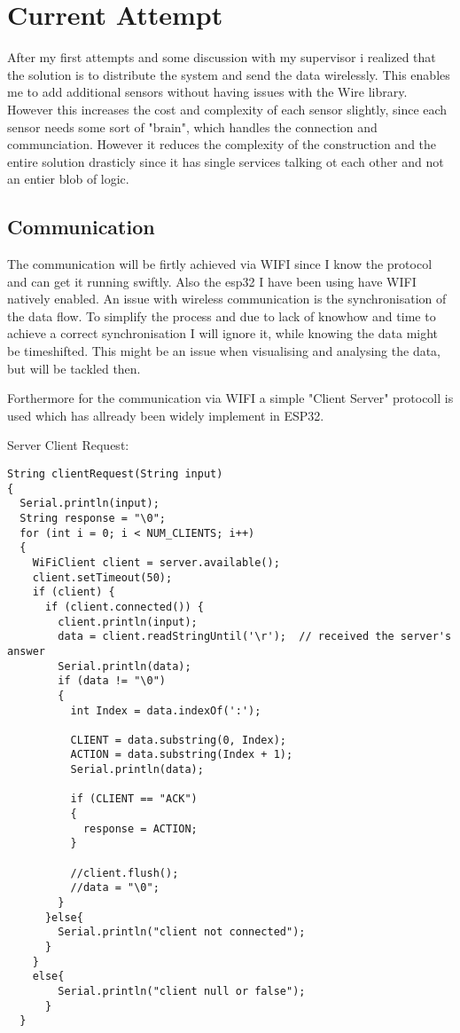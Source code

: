 \chapter*{Current Attempt}
\label{chap:Technical CHallenges}
\renewcommand{\thesection}{\arabic{section}}
\setcounter{section}{0}

After my first attempts and some discussion with my supervisor i realized that the solution is to distribute the system and send the data wirelessly. This enables me to add additional sensors without having issues with the Wire library. However this increases the cost and complexity of each sensor slightly, since each sensor needs some sort of "brain", which handles the connection and communciation. 
However it reduces the complexity of the construction and the entire solution drasticly since it has single services talking ot each other and not an entier blob of logic. 

\section{Communication}

The communication will be firtly achieved via WIFI since I know the protocol and can get it running swiftly. Also the esp32 I have been using have WIFI natively enabled. 
An issue with wireless communication is the synchronisation of the data flow. To simplify the process and due to lack of knowhow and time to achieve a correct synchronisation I will ignore it, while knowing the data might be timeshifted. 
This might be an issue when visualising and analysing the data, but will be tackled then.

Forthermore for the communication via WIFI a simple "Client Server" protocoll is used which has allready been widely implement in ESP32.

Server Client Request: 
\begin{lstlisting}
String clientRequest(String input)
{
  Serial.println(input);
  String response = "\0";
  for (int i = 0; i < NUM_CLIENTS; i++)
  {
    WiFiClient client = server.available();
    client.setTimeout(50);
    if (client) {
      if (client.connected()) {
        client.println(input);
        data = client.readStringUntil('\r');  // received the server's answer
        Serial.println(data);
        if (data != "\0")
        {
          int Index = data.indexOf(':');
        
          CLIENT = data.substring(0, Index);
          ACTION = data.substring(Index + 1);
          Serial.println(data);
   
          if (CLIENT == "ACK")
          {
            response = ACTION;
          }

          //client.flush();
          //data = "\0";
        }
      }else{
        Serial.println("client not connected");
      }
    }
    else{
        Serial.println("client null or false");
      }
  }
\end{lstlisting}


